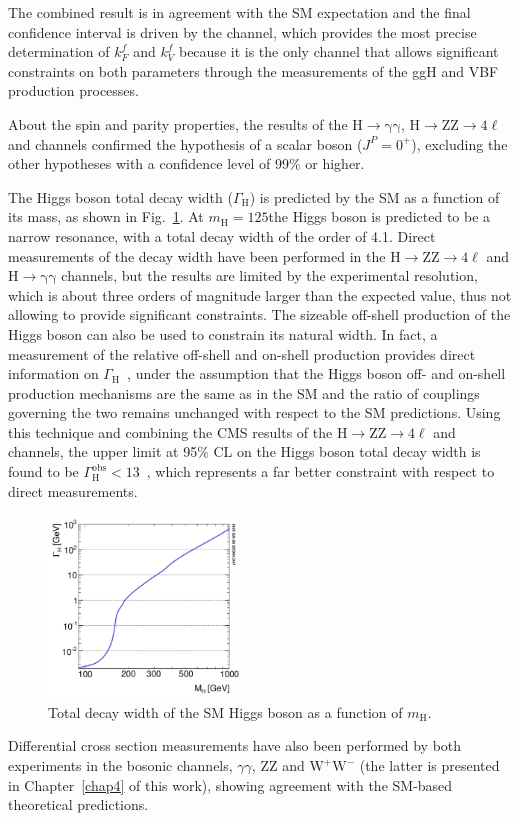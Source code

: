 The combined result is in agreement with the SM expectation and the final confidence interval is driven by the \hww channel, which provides the most precise determination of $k_F^f$ and $k_V^f$ because it is the only channel that allows significant constraints on both parameters through the measurements of the ggH and VBF production processes.

About the spin and parity properties, the results of the $\mathrm{H\to \gamma\gamma}$, $\mathrm{H\to ZZ\to 4\ell}$ and \hwwllnn channels confirmed the hypothesis of a scalar boson ($J^P = 0^+$), excluding the other hypotheses with a confidence level of 99\% or higher.

The Higgs boson total decay width ($\Gamma_\mathrm{H}$) is predicted by the SM as a function of its mass, as shown in Fig.~\ref{fig:width}. At $m_\mathrm{H}=125$\GeV the Higgs boson is predicted to be a narrow resonance, with a total decay width of the order of 4.1\MeV. Direct measurements of the decay width have been performed in the $\mathrm{H\to ZZ\to 4\ell}$ and $\mathrm{H\to\gamma\gamma}$ channels, but the results are limited by the experimental resolution, which is about three orders of magnitude larger than the expected value, thus not allowing to provide significant constraints. The sizeable off-shell production of the Higgs boson can also be used to constrain its natural width. In fact, a measurement of the relative off-shell and on-shell production provides direct information on $\Gamma_\mathrm{H}$~\cite{Caola:2013yja}, under the assumption that the Higgs boson off- and on-shell production mechanisms are the same as in the SM and the ratio of couplings governing the two remains unchanged with respect to the SM predictions. Using this technique and combining the CMS results of the $\mathrm{H\to ZZ\to 4\ell}$ and \hwwllnn channels, the upper limit at 95\% CL on the Higgs boson total decay width is found to be $\Gamma_\mathrm{H}^\mathrm{obs} < 13$\MeV~\cite{Khachatryan:2016ctc}, which represents a far better constraint with respect to direct measurements.

\begin{figure}[htb]
\centering
\includegraphics[width=0.45\textwidth]{images/width.pdf}
\caption{Total decay width of the SM Higgs boson as a function of $m_\mathrm{H}$.}\label{fig:width}
\end{figure}

Differential cross section measurements have also been performed by both experiments in the bosonic channels, $\gamma\gamma$, ZZ and $\mathrm{W^+W^-}$ (the latter is presented in Chapter~\ref{chap4} of this work), showing agreement with the SM-based theoretical predictions.

